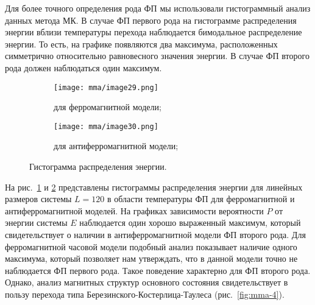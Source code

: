 Для более точного определения рода ФП мы использовали гистограммный анализ данных метода МК. В случае ФП первого рода на гистограмме распределения энергии вблизи температуры перехода наблюдается бимодальное распределение энергии. То есть, на графике появляются два максимума, расположенных симметрично относительно равновесного значения энергии. В случае ФП второго рода должен наблюдаться один максимум.

\begin{figure}[ht]
    \begin{subfigure}{0.5\textwidth}
        \texttt{[image: mma/image29.png]}
        \caption{для ферромагнитной модели;}
        \label{fig:mma-7a}
    \end{subfigure}
    \begin{subfigure}{0.5\textwidth}
        \texttt{[image: mma/image30.png]}
        \caption{для антиферромагнитной модели;}
        \label{fig:mma-7b}
    \end{subfigure}
    \caption{Гистограмма распределения энергии.}
    \label{fig:mma-7}
\end{figure}

На рис.~\ref{fig:mma-7a} и \ref{fig:mma-7b} представлены гистограммы распределения энергии для линейных размеров системы $L =120$ в области температуры ФП для ферромагнитной и антиферромагнитной моделей. На графиках зависимости вероятности $P$ от энергии системы $E$ наблюдается один хорошо выраженный максимум, который свидетельствует о наличии в антиферромагнитной модели ФП второго рода. Для ферромагнитной часовой модели подобный анализ показывает наличие одного максимума, который позволяет нам утверждать, что в данной модели точно не наблюдается ФП первого рода. Такое поведение характерно для ФП второго рода. Однако, анализ магнитных структур основного состояния свидетельствует в пользу перехода типа Березинского-Костерлица-Таулеса (рис.~\ref{fig:mma-4}). 



